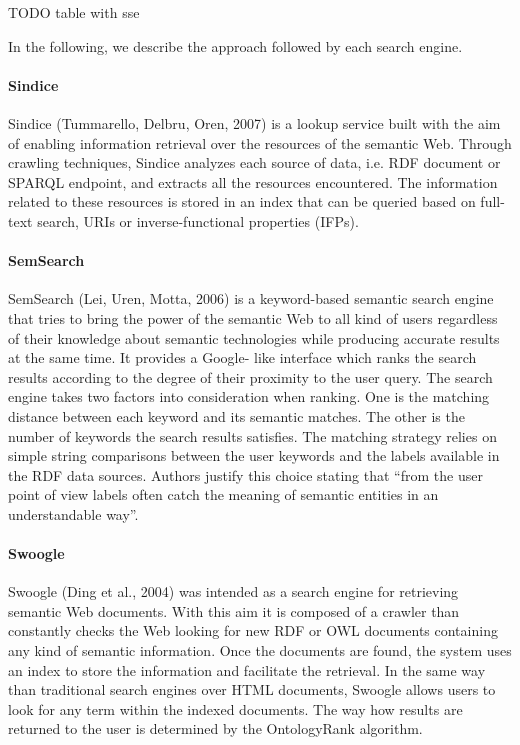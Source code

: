 TODO table with sse

In the following, we describe the approach followed by each search engine.

\paragraph{Sindice}
Sindice (Tummarello, Delbru, Oren, 2007) is a lookup service built with the aim of enabling information retrieval over the resources of the semantic Web. Through crawling techniques, Sindice analyzes each source of data, i.e. RDF document or SPARQL endpoint, and extracts all the resources encountered. The information related to these resources is stored in an index that can be queried based on full-text search, URIs or inverse-functional properties (IFPs).

\paragraph{SemSearch}
SemSearch (Lei, Uren, Motta, 2006) is a keyword-based semantic search engine that tries to bring the power of the semantic Web to all kind of users regardless of their knowledge about semantic technologies while producing accurate results at the same time. It provides a Google- like interface which ranks the search results according to the degree of their proximity to the user query. The search engine takes two factors into consideration when ranking. One is the matching distance between each keyword and its semantic matches. The other is the number of keywords the search results satisfies. The matching strategy relies on simple string comparisons between the user keywords and the labels available in the RDF data sources. Authors justify this choice stating that “from the user point of view labels often catch the meaning of semantic entities in an understandable way”.

\paragraph{Swoogle}
Swoogle (Ding et al., 2004) was intended as a search engine for retrieving semantic Web documents. With this aim it is composed of a crawler than constantly checks the Web looking for new RDF or OWL documents containing any kind of semantic information. Once the documents are found, the system uses an index to store the information and facilitate the retrieval. In the same way than traditional search engines over HTML documents, Swoogle allows users to look for any term within the indexed documents. The way how results are returned to the user is determined by the OntologyRank algorithm.

